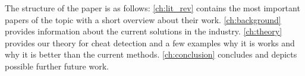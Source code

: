 The structure of the paper is as follows: \autoref{ch:lit_rev} contains the most important papers of the topic with a short overview about their work.
\autoref{ch:background} provides information about the current solutions in the industry.
\autoref{ch:theory} provides our theory for cheat detection and a few examples why it is works and why it is better than the current methods.
\autoref{ch:conclusion} concludes and depicts possible further future work.
